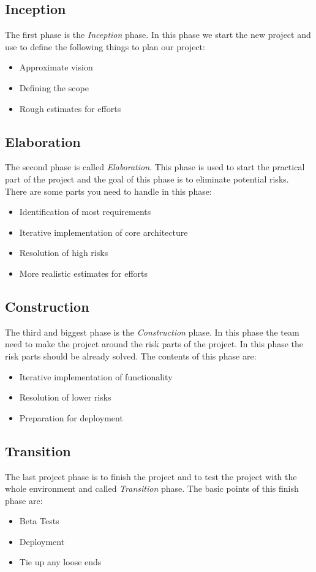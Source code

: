 \subsection{Inception}
The first phase is the \textit{Inception} phase. In this phase we start the new project and use to define the following things to plan our project:
\begin{itemize}
    \item Approximate vision
    \item Defining the scope
    \item Rough estimates for efforts
\end{itemize}

\subsection{Elaboration}
The second phase is called \textit{Elaboration}. This phase is used to start the practical part of the project and the goal of this phase is to eliminate potential risks. There are some parts you need to handle in this phase:
\begin{itemize}
    \item Identification of most requirements
    \item Iterative implementation of core architecture
    \item Resolution of high risks
    \item More realistic estimates for efforts
\end{itemize}

\subsection{Construction}
The third and biggest phase is the \textit{Construction} phase. In this phase the team need to make the project around the risk parts of the project. In this phase the risk parts should be already solved.
The contents of this phase are:
\begin{itemize}
    \item Iterative implementation of functionality
    \item Resolution of lower risks
    \item Preparation for deployment
\end{itemize}

\subsection{Transition}
The last project phase is to finish the project and to test the project with the whole environment and called \textit{Transition} phase.
The basic points of this finish phase are:
\begin{itemize}
    \item Beta Tests
    \item Deployment
    \item Tie up any loose ends
\end{itemize}

